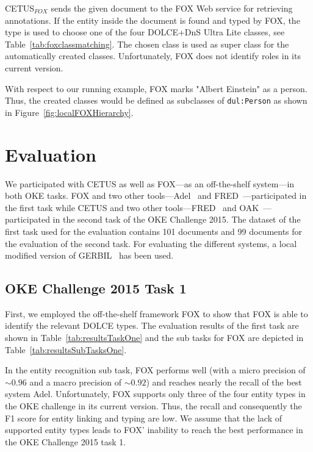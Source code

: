CETUS$_{FOX}$ sends the given document to the FOX Web service for retrieving annotations.
If the entity inside the document is found and typed by FOX, the type is used to choose one of the four DOLCE+DnS Ultra Lite classes, see Table~\ref{tab:foxclassmatching}.
The chosen class is used as super class for the automatically created classes.
Unfortunately, FOX does not identify roles in its current version.

With respect to our running example, FOX marks "Albert Einstein" as a person.
Thus, the created classes would be defined as subclasses of \texttt{dul:Person} as shown in Figure~\ref{fig:localFOXHierarchy}.

\section{Evaluation}

We participated with CETUS as well as FOX---as an off-the-shelf system---in both OKE tasks.
FOX and two other tools---Adel~\cite{adel} and FRED~\cite{fred_typing}---participated in the first task while
CETUS and two other tools---FRED~\cite{fred_typing} and OAK~\cite{oak_sheffield}---participated in the second task of the OKE Challenge 2015.
The dataset of the first task used for the evaluation contains 101 documents and 99 documents for the evaluation of the second task.
For evaluating the different systems, a local modified version of GERBIL~\cite{GERBIL} has been used.

\subsection{OKE Challenge 2015 Task 1}
First, we employed the off-the-shelf framework FOX to show that FOX is able to identify the relevant DOLCE types.
The evaluation results of the first task are shown in Table~\ref{tab:resultsTaskOne} and the sub tasks for FOX are depicted in Table~\ref{tab:resultsSubTasksOne}. 

In the entity recognition sub task, FOX performs well (with a micro precision of $\sim0.96$ and a macro precision of $\sim0.92$) and reaches nearly the recall of the best system Adel. 
Unfortunately, FOX supports only three of the four entity types in the OKE challenge in its current version.
Thus, the recall and consequently the F1 score for entity linking and typing are low. 
We assume that the lack of supported entity types leads to FOX' inability to reach the best performance in the OKE Challenge 2015 task 1.

